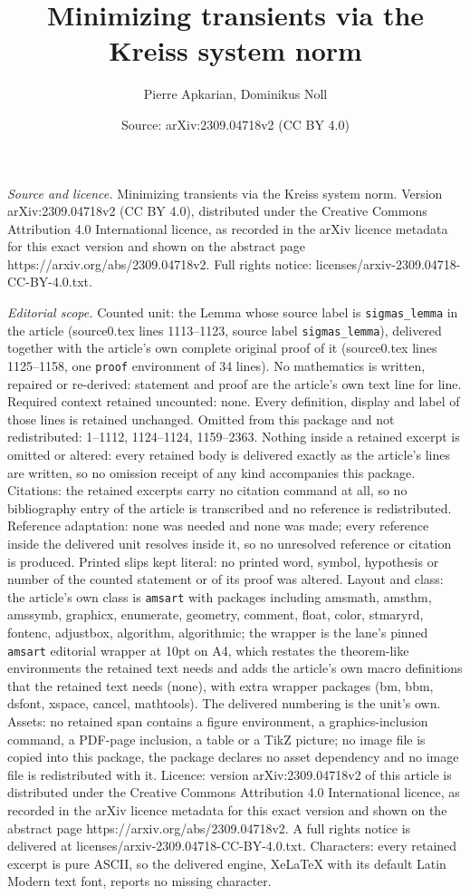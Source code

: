 \documentclass[10pt,a4paper]{amsart}
\title[Minimizing transients via the Kreiss system norm]{Minimizing transients via the Kreiss system norm}
\author{Pierre Apkarian, Dominikus Noll}
\date{Source: arXiv:2309.04718v2 (CC BY 4.0)}
\begin{document}
\maketitle

\noindent\emph{Source and licence.} Minimizing transients via the Kreiss system norm. Version arXiv:2309.04718v2 (CC BY 4.0), distributed under the Creative Commons Attribution 4.0 International licence, as recorded in the arXiv licence metadata for this exact version and shown on the abstract page https://arxiv.org/abs/2309.04718v2. Full rights notice: licenses/arxiv-2309.04718-CC-BY-4.0.txt.\par\smallskip

\noindent\textit{Editorial scope.} Counted unit: the Lemma whose source label is \texttt{sigmas\_lemma} in the article (source0.tex lines 1113--1123, source label \texttt{sigmas\_lemma}), delivered together with the article's own complete original proof of it (source0.tex lines 1125--1158, one \texttt{proof} environment of 34 lines). No mathematics is written, repaired or re-derived: statement and proof are the article's own text line for line. Required context retained uncounted: none. Every definition, display and label of those lines is retained unchanged. Omitted from this package and not redistributed: 1--1112, 1124--1124, 1159--2363. Nothing inside a retained excerpt is omitted or altered: every retained body is delivered exactly as the article's lines are written, so no omission receipt of any kind accompanies this package. Citations: the retained excerpts carry no citation command at all, so no bibliography entry of the article is transcribed and no reference is redistributed. Reference adaptation: none was needed and none was made; every reference inside the delivered unit resolves inside it, so no unresolved reference or citation is produced. Printed slips kept literal: no printed word, symbol, hypothesis or number of the counted statement or of its proof was altered. Layout and class: the article's own class is \texttt{amsart} with packages including amsmath, amsthm, amssymb, graphicx, enumerate, geometry, comment, float, color, stmaryrd, fontenc, adjustbox, algorithm, algorithmic; the wrapper is the lane's pinned \texttt{amsart} editorial wrapper at 10pt on A4, which restates the theorem-like environments the retained text needs and adds the article's own macro definitions that the retained text needs (none), with extra wrapper packages (bm, bbm, dsfont, xspace, cancel, mathtools). The delivered numbering is the unit's own. Assets: no retained span contains a figure environment, a graphics-inclusion command, a PDF-page inclusion, a table or a TikZ picture; no image file is copied into this package, the package declares no asset dependency and no image file is redistributed with it. Licence: version arXiv:2309.04718v2 of this article is distributed under the Creative Commons Attribution 4.0 International licence, as recorded in the arXiv licence metadata for this exact version and shown on the abstract page https://arxiv.org/abs/2309.04718v2. A full rights notice is delivered at licenses/arxiv-2309.04718-CC-BY-4.0.txt. Characters: every retained excerpt is pure ASCII, so the delivered engine, XeLaTeX with its default Latin Modern text font, reports no missing character.
\end{document}
